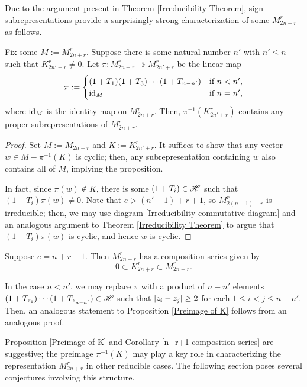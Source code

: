 \documentclass{amsart}
\begin{document}
 Due to the argument present in Theorem \ref{Irreducibility Theorem}, sign subrepresentations provide a surprisingly strong characterization of some $M_{2n + r}^r$ as follows.
 \begin{proposition}\label{Preimage of K}
 	Fix some $M := M_{2n + r}^r$.
 	Suppose there is some natural number $n'$ with $n' \leq n$ such that $K_{2n' + r}^r \neq 0$.
 	Let $\pi:M_{2n + r}^r \twoheadrightarrow M_{2n' + r}^r$ be the linear map
 	\[
 	\pi := \begin{cases}
 	(1 + T_1)(1 + T_3)\cdots(1 + T_{n-n'}) & \text{if } n < n',\\
 	\operatorname{id}_{M} & \text{if } n = n',
 	\end{cases}
 	\]
  where $\operatorname{id}_{M}$ is the identity map on $M_{2n + r}^r$.
  Then, $\pi^{-1}(K_{2n' + r}^r)$ contains any proper subrepresentations of $M_{2n + r}^r$.
 \end{proposition}
 \begin{proof}
   Set $M := M_{2n + r}$ and $K := K_{2n' + r}^r$.
  It suffices to show that any vector $w \in M - \pi^{-1}(K)$ is cyclic;
 	then, any subrepresentation containing $w$ also contains all of $M$, implying the proposition.
 	
 	In fact, since $\pi(w) \notin K$, there is some $(1 + T_i) \in \mathscr{H}$ such that $(1 + T_i)\pi(w) \neq 0$.
 	Note that $e > (n'-1) + r + 1$, so $M_{2(n-1) + r}^r$ is irreducible;
 	then, we may use diagram \eqref{Irreducibility commutative diagram} and an analogous argument to Theorem \ref{Irreducibility Theorem} to argue that $(1 + T_i)\pi(w)$ is cyclic, and hence $w$ is cyclic.
 \end{proof}
 \begin{corollary}\label{n+r+1 composition series}
 	Suppose $e = n + r + 1$.
 	Then $M_{2n + r}^r$ has a composition series given by
 	\[
    0 \subset K_{2n + r}^r \subset M_{2n + r}^r.
 	\]
 \end{corollary}

 \begin{remark}
   In the case $n < n'$, we may replace $\pi$ with a product of $n-n'$ elements $(1 + T_{z_1})\cdots(1 + T_{z_{n-n'}}) \in \mathscr{H}$ such that $\left| z_i - z_j \right| \geq 2$ for each $1 \leq i < j \leq n-n'$.
   Then, an analogous statement to Proposition \ref{Preimage of K} follows from an analogous proof.
 \end{remark}
 
 Proposition \ref{Preimage of K} and Corollary \ref{n+r+1 composition series} are suggestive;
 the preimage $\pi^{-1}(K)$ may play a key role in characterizing the representation $M_{2n + r}^r$ in other reducible cases.
 The following section poses several conjectures involving this structure.
  
\end{document}
